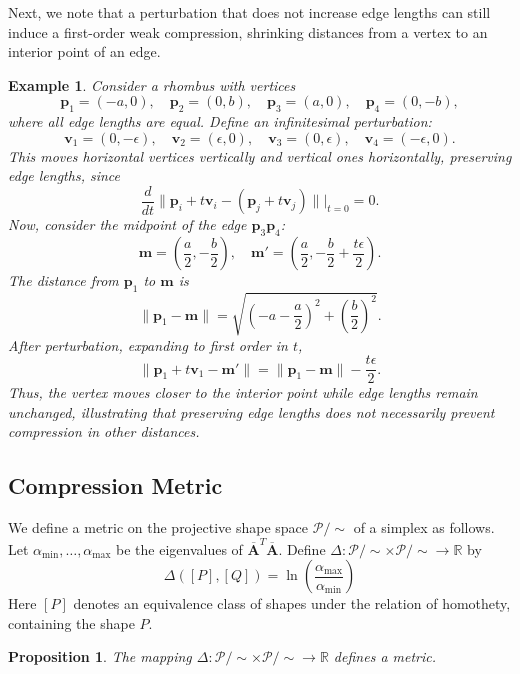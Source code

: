 \documentclass[a4paper, 12pt]{amsart}
\theoremstyle{plain}
\newtheorem{Ex}[Thm]{Example}
\newtheorem{Prop}[Thm]{Proposition}
\begin{document}
Next, we note that a perturbation that does not increase edge lengths can still induce a first-order weak compression, shrinking distances from a vertex to an interior point of an edge.


\begin{Ex}
Consider a rhombus with vertices  
$$
\mathbf{p}_1 = (-a,0), \quad \mathbf{p}_2 = (0,b), \quad \mathbf{p}_3 = (a,0), \quad \mathbf{p}_4 = (0,-b),
$$
where all edge lengths are equal. Define an infinitesimal perturbation:  
$$
\mathbf{v}_1 = (0, -\epsilon), \quad \mathbf{v}_2 = (\epsilon, 0), \quad \mathbf{v}_3 = (0, \epsilon), \quad \mathbf{v}_4 = (-\epsilon, 0).
$$
This moves horizontal vertices vertically and vertical ones horizontally, preserving edge lengths, since  
$$
\frac{d}{dt} \|\mathbf{p}_i + t\mathbf{v}_i - (\mathbf{p}_j + t\mathbf{v}_j)\| \Big|_{t=0} = 0.
$$
Now, consider the midpoint of the edge $\mathbf{p}_3 \mathbf{p}_4$:  
$$
\mathbf{m} = \left( \frac{a}{2}, -\frac{b}{2} \right), \quad
\mathbf{m}' = \left( \frac{a}{2}, -\frac{b}{2} + \frac{t\epsilon}{2} \right).
$$
The distance from $\mathbf{p}_1$ to $\mathbf{m}$ is  
$$
\|\mathbf{p}_1 - \mathbf{m}\| = \sqrt{\left(-a - \frac{a}{2}\right)^2 + \left(\frac{b}{2}\right)^2}.
$$
After perturbation, expanding to first order in $t$,  
$$
\|\mathbf{p}_1 + t \mathbf{v}_1 - \mathbf{m}'\| = \|\mathbf{p}_1 - \mathbf{m}\| - \frac{t\epsilon}{2}.
$$
Thus, the vertex moves closer to the interior point while edge lengths remain unchanged, illustrating that preserving edge lengths does not necessarily prevent compression in other distances.
\end{Ex}

\subsection{Compression Metric}

We define a metric on the projective shape space $\mathcal{P}/\sim$ of a simplex as follows. Let $\alpha_{\min}, \dots, \alpha_{\max}$ be the eigenvalues of $\overline{\mathbf{A}}^T \overline{\mathbf{A}}$. Define $\Delta: \mathcal{P}/\sim \times \mathcal{P}/\sim \to \mathbb{R}$ by  
$$
\Delta([P], [Q]) = \ln \left(\frac{\alpha_{\max}}{\alpha_{\min}}\right)
$$
Here $[P]$ denotes an equivalence class of shapes under the relation of homothety, containing the shape $P$.

\begin{Prop}\label{metric}
The mapping $\Delta: \mathcal{P}/\sim \times \mathcal{P}/\sim \to \mathbb{R}$ defines a metric.
\end{Prop}
\end{document}
